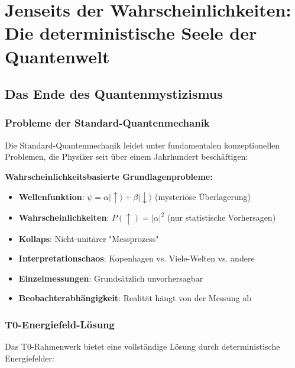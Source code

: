 \documentclass[12pt,a4paper]{report}
\begin{document}
	\chapter{Jenseits der Wahrscheinlichkeiten: Die deterministische Seele der Quantenwelt}
	\label{chap:deterministic_qm}
	
	\section{Das Ende des Quantenmystizismus}
	\label{sec:end_quantum_mysticism}
	
	\subsection{Probleme der Standard-Quantenmechanik}
	\label{subsec:standard_qm_problems}
	
	Die Standard-Quantenmechanik leidet unter fundamentalen konzeptionellen Problemen, die Physiker seit über einem Jahrhundert beschäftigen:
	
	\begin{tcolorbox}[colback=red!5!white,colframe=red!75!black,title=Probleme der Standard-QM]
		\textbf{Wahrscheinlichkeitsbasierte Grundlagenprobleme:}
		\begin{itemize}
			\item \textbf{Wellenfunktion}: $\psi = \alpha|\uparrow\rangle + \beta|\downarrow\rangle$ (mysteriöse Überlagerung)
			\item \textbf{Wahrscheinlichkeiten}: $P(\uparrow) = |\alpha|^2$ (nur statistische Vorhersagen)
			\item \textbf{Kollaps}: Nicht-unitärer "Messprozess"
			\item \textbf{Interpretationschaos}: Kopenhagen vs. Viele-Welten vs. andere
			\item \textbf{Einzelmessungen}: Grundsätzlich unvorhersagbar
			\item \textbf{Beobachterabhängigkeit}: Realität hängt von der Messung ab
		\end{itemize}
	\end{tcolorbox}
	
	\subsection{T0-Energiefeld-Lösung}
	\label{subsec:t0_solution}
	
	Das T0-Rahmenwerk bietet eine vollständige Lösung durch deterministische Energiefelder:
	
\end{document}
